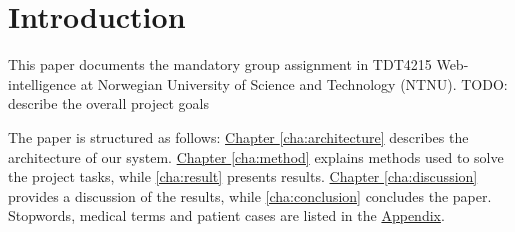\chapter{Introduction}
This paper documents the mandatory group assignment in TDT4215 Web-intelligence
at Norwegian University of Science and Technology (NTNU).
TODO: describe the overall project goals

The paper is structured as follows:
\hyperref[cha:architecture]{Chapter \ref*{cha:architecture}} describes the
architecture of our system.
\hyperref[cha:method]{Chapter \ref*{cha:method}} explains methods used to
solve the project tasks, while \autoref{cha:result} presents results.
\hyperref[cha:discussion]{Chapter \ref*{cha:discussion}} provides a discussion
of the results, while \autoref{cha:conclusion} concludes the paper.
Stopwords, medical terms and patient cases are listed in the
\hyperref[appendix]{Appendix}.
